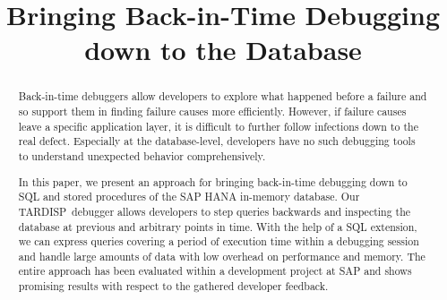 \documentclass[english,conference]{IEEEtran}
\newcommand{\tool}{TAR\-DISP}
\begin{document}
\title{Bringing Back-in-Time Debugging\\ down to the Database}

\author{
\and
{}
\and
{}
}




\maketitle
\begin{abstract}
Back-in-time debuggers allow developers to explore what happened before a failure and so support them in finding failure causes more efficiently. 
However, if failure causes leave a specific application layer, it is difficult to further follow infections down to the real defect.
Especially at the database-level, developers have no such debugging tools to understand unexpected behavior comprehensively.

In this paper, we present an approach for bringing back-in-time debugging down to SQL and stored procedures of the SAP HANA in-memory database.
Our \tool\ debugger allows developers to step queries backwards and inspecting the database at previous and arbitrary points in time.
With the help of a SQL extension, we can express queries covering a period of execution time within a debugging session and handle large amounts of data with low overhead on performance and memory.
The entire approach has been evaluated within a development project at SAP and shows promising results with respect to the gathered developer feedback.
\end{abstract}
\end{document}
